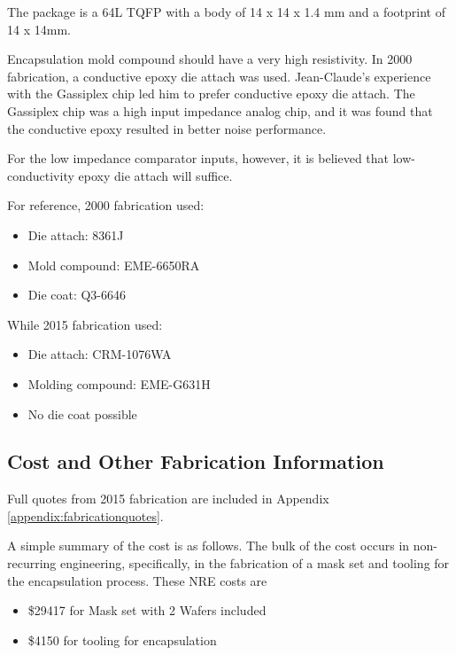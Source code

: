 \documentclass[letterpaper]{article}
\begin{document}
The package is a 64L TQFP with a body of 14 x 14 x 1.4 mm and a footprint of 14 x 14mm.

Encapsulation mold compound should have a very high resistivity. In 2000 fabrication, a conductive epoxy die attach was used. Jean-Claude's experience with the Gassiplex chip led him to prefer conductive epoxy die attach. The Gassiplex chip was a high input impedance analog chip, and it was found that the conductive epoxy resulted in better noise performance.

For the low impedance comparator inputs, however, it is believed that low-conductivity epoxy die attach will suffice.

For reference, 2000 fabrication used:
\begin{itemize}
    \item Die attach: 8361J
    \item Mold compound: EME-6650RA
    \item Die coat: Q3-6646
\end{itemize}

While 2015 fabrication used:
\begin{itemize}
    \item Die attach: CRM-1076WA
    \item Molding compound: EME-G631H
    \item No die coat possible
\end{itemize}

%


\subsection{Cost and Other Fabrication Information}

Full quotes from 2015 fabrication are included in Appendix \ref{appendix:fabricationquotes}.

A simple summary of the cost is as follows. The bulk of the cost occurs in non-recurring engineering, specifically, in the fabrication of a mask set and tooling for the encapsulation process. These NRE costs are

\begin{itemize}
    \item \$29417 for Mask set with 2 Wafers included
    \item \$4150 for tooling for encapsulation
\end{itemize}
\end{document}
